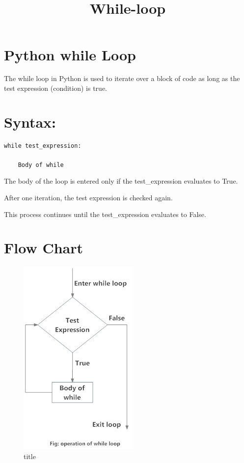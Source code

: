 \documentclass[11pt]{article}
\title{While-loop}
\makeatletter
\def\maxwidth{\ifdim\Gin@nat@width>\linewidth\linewidth
    \else\Gin@nat@width\fi}
\let\Oldincludegraphics\includegraphics
\renewcommand{\includegraphics}[1]{\Oldincludegraphics[width=.8\maxwidth]{#1}}
\makeatother
\begin{document}
    
    
    \maketitle
    
    

    
    \section{Python while Loop}\label{python-while-loop}

    The while loop in Python is used to iterate over a block of code as long
as the test expression (condition) is true.

    \section{Syntax:}\label{syntax}

    \begin{verbatim}
while test_expression:
    
    Body of while
\end{verbatim}

    The body of the loop is entered only if the test\_expression evaluates
to True.

After one iteration, the test expression is checked again.

This process continues until the test\_expression evaluates to False.

    \section{Flow Chart}\label{flow-chart}

    \begin{figure}
\centering
\includegraphics{whileloop.jpg}
\caption{title}
\end{figure}
\end{document}
